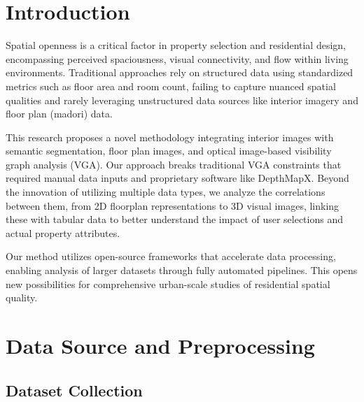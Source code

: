 \documentclass[11pt,a4paper]{article}
\begin{document}
\begin{multicols}{2}
\fontsize{11}{13}\selectfont

\section{Introduction}

Spatial openness is a critical factor in property selection and residential design, encompassing
perceived spaciousness, visual connectivity, and flow within living environments. Traditional
approaches rely on structured data using standardized metrics such as floor area and room count,
failing to capture nuanced spatial qualities and rarely leveraging unstructured data sources
like interior imagery and floor plan (madori) data.

This research proposes a novel methodology integrating interior images with semantic segmentation,
floor plan images, and optical image-based visibility graph analysis (VGA). Our approach breaks
traditional VGA constraints that required manual data inputs and proprietary software like
DepthMapX. Beyond the innovation of utilizing multiple data types, we analyze the correlations
between them, from 2D floorplan representations to 3D visual images, linking these with tabular
data to better understand the impact of user selections and actual property attributes.

Our method utilizes open-source frameworks that accelerate data processing, enabling analysis
of larger datasets through fully automated pipelines. This opens new possibilities for
comprehensive urban-scale studies of residential spatial quality.

\section{Data Source and Preprocessing}

\subsection{Dataset Collection}


\end{multicols}
\end{document}
